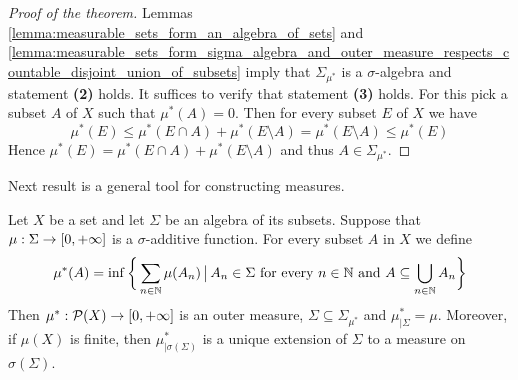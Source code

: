 \begin{proof}[Proof of the theorem]
Lemmas \ref{lemma:measurable_sets_form_an_algebra_of_sets} and \ref{lemma:measurable_sets_form_sigma_algebra_and_outer_measure_respects_countable_disjoint_union_of_subsets} imply that $\Sigma_{\mu^*}$ is a $\sigma$-algebra and statement \textbf{(2)} holds. It suffices to verify that statement \textbf{(3)} holds. For this pick a subset $A$ of $X$ such that $\mu^*(A) = 0$. Then for every subset $E$ of $X$ we have
$$\mu^*(E) \leq \mu^*(E\cap A) + \mu^*(E\setminus A) = \mu^*(E\setminus A)\leq \mu^*(E)$$
Hence $\mu^*(E) = \mu^*(E\cap A)+\mu^*(E\setminus A)$ and thus $A\in \Sigma_{\mu^*}$.
\end{proof}
\noindent
Next result is a general tool for constructing measures.

\begin{theorem}\label{theorem:caratheodory_extension_result}
Let $X$ be a set and let $\Sigma$ be an algebra of its subsets. Suppose that $\mu:\Sigma\rightarrow [0,+\infty]$ is a $\sigma$-additive function. For every subset $A$ in $X$ we define
$$\mu^*(A) = \inf \bigg\{\sum_{n\in {\mathbb N}}\mu(A_n)\,\big|\,A_n\in \Sigma\mbox{ for every }n\in {\mathbb N}\mbox{ and }A\subseteq \bigcup_{n\in {\mathbb N}}A_n\bigg\}$$
Then $\mu^*:{\mathcal P}(X)\rightarrow [0,+\infty]$ is an outer measure, $\Sigma \subseteq \Sigma_{\mu^*}$ and $\mu^*_{\mid \Sigma} = \mu$. Moreover, if $\mu(X)$ is finite, then $\mu^*_{\mid \sigma(\Sigma)}$ is a unique extension of $\Sigma$ to a measure on $\sigma(\Sigma)$.
\end{theorem}
